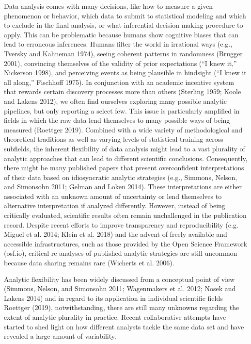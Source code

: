 \documentclass[
  12pt,
]{article}
\begin{document}
Data analysis comes with many decisions, like how to measure a given phenomenon or behavior, which data to submit to statistical modeling and which to exclude in the final analysis, or what inferential decision making procedure to apply.
This can be problematic because humans show cognitive biases that can lead to erroneous inferences.
Humans filter the world in irrational ways (e.g., Tversky and Kahneman 1974), seeing coherent patterns in randomness (Brugger 2001), convincing themselves of the validity of prior expectations ({``I knew it,''} Nickerson 1998), and perceiving events as being plausible in hindsight ({``I knew it all along,''} Fischhoff 1975).
In conjunction with an academic incentive system that rewards certain discovery processes more than others (Sterling 1959; Koole and Lakens 2012), we often find ourselves exploring many possible analytic pipelines, but only reporting a select few.
This issue is particularly amplified in fields in which the raw data lend themselves to many possible ways of being measured (Roettger 2019).
Combined with a wide variety of methodological and theoretical traditions as well as varying levels of statistical training across subfields, the inherent flexibility of data analysis might lead to a vast plurality of analytic approaches that can lead to different scientific conclusions.
Consequently, there might be many published papers that present overconfident interpretations of their data based on idiosyncratic analytic strategies (e.g., Simmons, Nelson, and Simonsohn 2011; Gelman and Loken 2014).
These interpretations are either associated with an unknown amount of uncertainty or lend themselves to alternative interpretation if analyzed differently.
However, instead of being critically evaluated, scientific results often remain unchallenged in the publication record.
Despite recent efforts to improve transparency and reproducibility (e.g. Miguel et al. 2014; Klein et al. 2018) and the advent of freely available and accessible infrastructures, such as those provided by the Open Science Framework (osf.io), critical re-analyses of published analytic strategies are still uncommon because data sharing remains rare (Wicherts et al. 2006).

Analytic flexibility has been widely discussed from a conceptual point of view (Simmons, Nelson, and Simonsohn 2011; Wagenmakers et al. 2012; Nosek and Lakens 2014) and in regard to its application in individual scientific fields Roettger (2019), notwithstanding, there are still many unknowns regarding the extent of analytic plurality in practice.
Recent collaborative attempts have started to shed light on how different analysts tackle the same data set and have revealed a large amount of variability.
\end{document}
